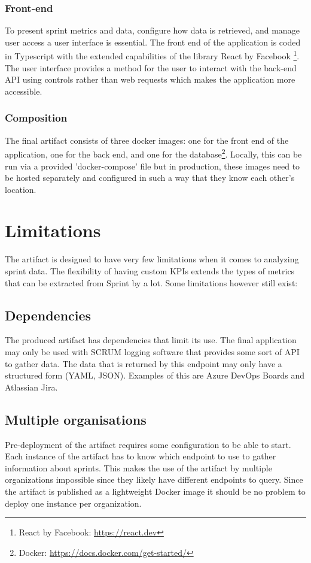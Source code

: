 \subsubsection*{Front-end}

To present sprint metrics and data, configure how data is retrieved,
and manage user access a user interface is essential.
The front end of the application is coded in Typescript with the
extended capabilities of the library React by Facebook 
\footnote{React by Facebook: \url{https://react.dev}}. 
The user interface provides a method for the user to interact with the back-end API using controls rather than web requests which makes the application more accessible.  

\subsubsection*{Composition}

The final artifact consists of three docker images: 
one for the front end of the application, one for the back end,
and one for the database\footnote{Docker: \url{https://docs.docker.com/get-started/}}.
Locally, this can be run via a provided 'docker-compose' file but in production,
these images need to be hosted separately and configured in such a 
way that they know each other's location.

\section{Limitations}

The artifact is designed to have very few limitations when it comes to analyzing sprint data. 
The flexibility of having custom KPIs extends the types of metrics that can be extracted 
from Sprint by a lot. Some limitations however still exist:

\subsection*{Dependencies}

The produced artifact has dependencies that limit its use. The final application may only be used with SCRUM logging software that provides some sort of API to gather data. The data that is returned by this endpoint may only have a structured form (YAML, JSON). Examples of this are Azure DevOps Boards and Atlassian Jira.

\subsection*{Multiple organisations}
Pre-deployment of the artifact requires some configuration to be able to start. Each instance of the artifact has to know which endpoint to use to gather information about sprints. This makes the use of the artifact by multiple organizations impossible since they likely have different endpoints to query. Since the artifact is published as a lightweight Docker image it should be no problem to deploy one instance per organization. 

